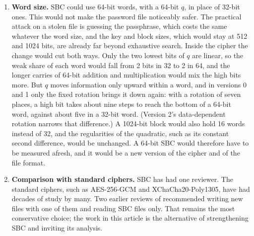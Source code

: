 \begin{enumerate}[resume]
\item \textbf{Word size.} SBC could use 64-bit words, with a 64-bit $q$, in
      place of 32-bit ones. This would not make the password file noticeably
      safer. The practical attack on a stolen file is guessing the passphrase,
      which costs the same whatever the word size, and the key and block
      sizes, which would stay at 512 and 1024 bits, are already far beyond
      exhaustive search. Inside the cipher the change would cut both ways.
      Only the two lowest bits of $q$ are linear, so the weak share of each
      word would fall from 2 bits in 32 to 2 in 64, and the longer carries of
      64-bit addition and multiplication would mix the high bits more. But $q$
      moves information only upward within a word, and in versions 0 and 1 only
      the fixed rotation brings it down again: with a rotation of seven places,
      a high bit takes about nine steps to reach the bottom of a 64-bit word,
      against about five in a 32-bit word. (Version 2's data-dependent rotation
      narrows that difference.) A 1024-bit block would also hold 16 words instead of
      32, and the regularities of the quadratic, such as its constant second
      difference, would be unchanged. A 64-bit SBC would therefore have to be
      measured afresh, and it would be a new version of the cipher and of the
      file format.

\item \label{item:standard}\textbf{Comparison with standard ciphers.} SBC has had one reviewer. The
      standard ciphers, such as AES-256-GCM \cite{fips197} and
      XChaCha20-Poly1305, have had decades of study by many. Two earlier
      reviews of  recommended writing new files with one of them
      and reading SBC files only. That remains the most conservative choice;
      the work in this article is the alternative of strengthening SBC and
      inviting its analysis.
\end{enumerate}

